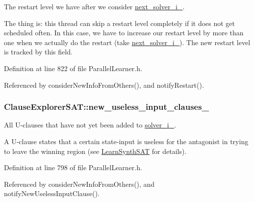 The restart level we have after we consider \hyperlink{classClauseExplorerSAT_abbaa9b938df08f811dd361216527176c}{next\-\_\-solver\-\_\-i\-\_\-}. 

The thing is\-: this thread can skip a restart level completely if it does not get scheduled often. In this case, we have to increase our restart level by more than one when we actually do the restart (take \hyperlink{classClauseExplorerSAT_abbaa9b938df08f811dd361216527176c}{next\-\_\-solver\-\_\-i\-\_\-}). The new restart level is tracked by this field. 

Definition at line 822 of file Parallel\-Learner.\-h.



Referenced by consider\-New\-Info\-From\-Others(), and notify\-Restart().

\hypertarget{classClauseExplorerSAT_a3d1bdb9a6484c85af655a4eed1ee5f19}{
\subsubsection[{new\-\_\-useless\-\_\-input\-\_\-clauses\-\_\-}]{ Clause\-Explorer\-S\-A\-T\-::new\-\_\-useless\-\_\-input\-\_\-clauses\-\_\-\hspace{0.3cm}{\ttfamily [protected]}}}\label{classClauseExplorerSAT_a3d1bdb9a6484c85af655a4eed1ee5f19}


All U-\/clauses that have not yet been added to \hyperlink{classClauseExplorerSAT_a65b5b3d04ff5be8bfec60d3dcf86e4d0}{solver\-\_\-i\-\_\-}. 

A U-\/clause states that a certain state-\/input is useless for the antagonist in trying to leave the winning region (see \hyperlink{classLearnSynthSAT}{Learn\-Synth\-S\-A\-T} for details). 

Definition at line 798 of file Parallel\-Learner.\-h.



Referenced by consider\-New\-Info\-From\-Others(), and notify\-New\-Useless\-Input\-Clause().

